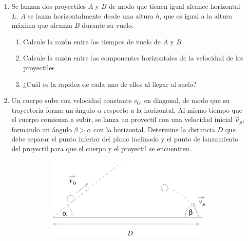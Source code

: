 \documentclass[letterpaper,11pt]{article}
\begin{document}
\begin{enumerate}
\item Se lanzan dos proyectiles $A$ y $B$ de modo que tienen igual alcance horizontal $L$. $A$ se lanza horizontalmente desde una altura $h$, que es igual a la altura máxima que alcanza $B$ durante su vuelo.
{
    \begin{multicols}{2}
        \begin{enumerate}
            \item Calcule la razón entre los tiempos de vuelo de $A$ y $B$
            \item Calcule la razón entre las componentes horizontales de la velocidad de los proyectiles
            \item ¿Cuál es la rapidez de cada uno de ellos al llegar al suelo?
        \end{enumerate}
        
        \columnbreak
        
        \begin{figure}[H]
            \centering
            
        \end{figure}
        
    \end{multicols}
}

\item Un cuerpo sube con velocidad constante $v_0$, en diagonal, de modo que su trayectoria forma un ángulo $\alpha$ respecto a la horizontal. Al mismo tiempo que el cuerpo comienza a subir, se lanza un proyectil con una velocidad inicial $\vec{v}_p$, formando un ángulo $\beta > \alpha$ con la horizontal.  Determine la distancia $D$ que debe separar el punto inferior del plano inclinado y el punto de lanzamiento del proyectil para que el cuerpo y el proyectil se encuentren.

\begin{figure}[H]
    \centering
    \begin{subfigure}[t]{1\textwidth}
        \centering
        \includegraphics[width=0.4\linewidth]{2022-1/img/aux2/colision.PNG}
    \end{subfigure}
\end{figure}



\end{enumerate}
\end{document}
